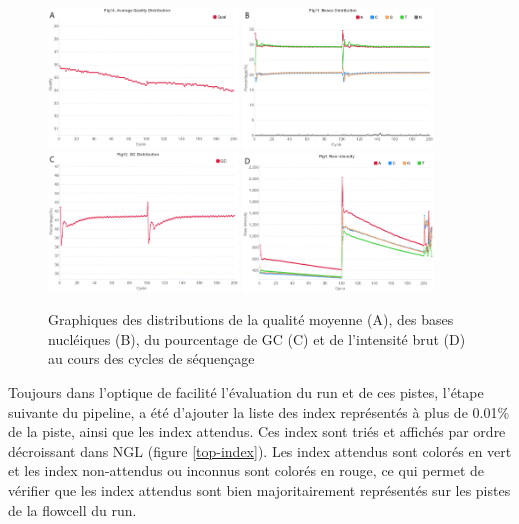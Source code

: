 \begin{figure}[H]
    \centering
    \includegraphics[width=0.45\textwidth]{img/mean_quality.png}
    \includegraphics[width=0.45\textwidth]{img/bases_content.png}\\
    \includegraphics[width=0.45\textwidth]{img/GC_content.png}
    \includegraphics[width=0.45\textwidth]{img/raw_intensity.png}
    \caption{\footnotesize{Graphiques des distributions de la qualité moyenne (A), des bases nucléiques (B), du pourcentage de GC (C) et de l'intensité brut (D) au cours des cycles de séquençage}}
    \label{Graph-rapport-pistes}
\end{figure}

Toujours dans l'optique de facilité l'évaluation du run et de ces pistes, l'étape suivante du pipeline, a été  d'ajouter la liste des index représentés à plus de 0.01\% de la piste, ainsi que les index attendus.
Ces index sont triés et affichés par ordre décroissant dans NGL (figure \ref{top-index}).
Les index attendus sont colorés en vert et les index non-attendus ou inconnus sont colorés en rouge, ce qui permet de vérifier que les index attendus sont bien majoritairement représentés sur les pistes de la flowcell du run.

